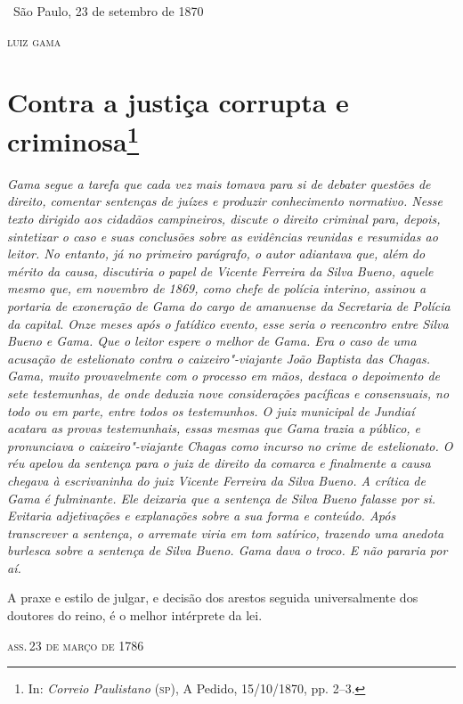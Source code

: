 \bigskip

\hfill\ São Paulo, 23 de setembro de 1870

\hfill\textsc{luiz gama}

\chapter{Contra a justiça corrupta e criminosa\footnote[*]{In: \emph{Correio
  Paulistano} (\textsc{sp}), A Pedido, 15/10/1870, pp. 2--3.}}

\begin{flushleft}
{\footnotesize\itshape
Gama segue a tarefa que cada vez mais tomava para si de debater
questões de direito, comentar sentenças de juízes e produzir
conhecimento normativo. Nesse texto dirigido
aos cidadãos campineiros, discute o direito criminal para, depois, sintetizar o
caso e suas conclusões sobre as evidências reunidas e resumidas ao
leitor. No entanto, já no primeiro parágrafo, o autor adiantava que,
além do mérito da causa, discutiria o papel de Vicente Ferreira da Silva Bueno,
aquele mesmo que, em novembro de 1869,
como chefe de polícia interino, assinou a portaria de exoneração de Gama
do cargo de amanuense da Secretaria de Polícia da capital.
Onze meses após o fatídico evento, esse seria o
reencontro entre Silva Bueno e Gama. Que o leitor espere
o melhor de Gama. Era o caso de uma acusação de estelionato contra o
caixeiro"-viajante João Baptista das Chagas. Gama, muito provavelmente
com o processo em mãos, destaca o depoimento de sete testemunhas, de
onde deduzia nove considerações
pacíficas e consensuais, no todo ou em parte, entre todos os
testemunhos. O juiz municipal de Jundiaí acatara as
provas testemunhais, essas mesmas que Gama trazia a público, e
pronunciava o caixeiro"-viajante Chagas como incurso no crime de
estelionato. O réu apelou da sentença para o juiz de direito da comarca
e finalmente a causa chegava à escrivaninha do juiz Vicente Ferreira da
Silva Bueno. A crítica de Gama é fulminante. Ele deixaria que a sentença
de Silva Bueno falasse por si. Evitaria adjetivações e explanações sobre
a sua forma e conteúdo. Após transcrever a sentença, o arremate viria em tom satírico,
trazendo uma anedota burlesca sobre a sentença de Silva Bueno. Gama dava o
troco. E não pararia por aí. }
\end{flushleft}


\setcounter{footnote}{-1}
\epigraph{A praxe e estilo de julgar, e decisão dos arestos\footnotemark{} seguida universalmente dos doutores do reino, é o melhor
intérprete da lei.}{\textsc{ass.\,23 de março de 1786\footnotemark}}

